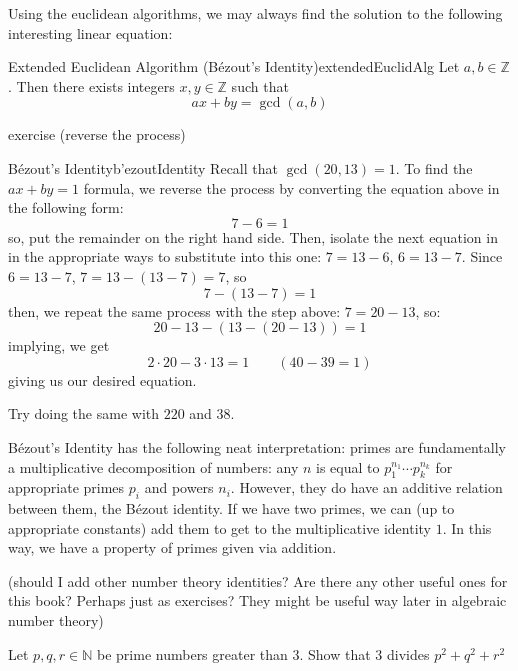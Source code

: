 \documentclass{book}
\newcommand{\N}{{\mathbb{N}}}
\newcommand{\Z}{{\mathbb{Z}}}
\begin{document}
Using the euclidean algorithms, we may always find the solution to the following interesting linear equation:

\begin{thm}{Extended Euclidean Algorithm (B\'ezout's Identity)}{extendedEuclidAlg}
	Let $a,b \in \Z$. Then there exists integers $x,y \in \Z$ such that
\[
	ax +by = \gcd(a,b)
\]
\end{thm}

\begin{Proof}
	exercise (reverse the process)
\end{Proof}

\begin{example}{B\'ezout's Identity}{b'ezoutIdentity}
	Recall that $\gcd(20, 13) = 1$. To find the $ax + by = 1$ formula, we reverse the
	process by converting the equation above in the following form:
	\[
		7 - 6 = 1
	\]
	so, put the remainder on the right hand side. Then, isolate the next equation in in the appropriate ways to
	substitute into this one: $7 = 13-6$, $6 = 13-7$. Since $6 =13-7$, $7 = 13-(13-7) = 7$, so
	\[
		7 - (13-7) = 1
	\]
	then, we repeat the same process with the step above: $7 = 20-13$, so:
	\[
		20-13-(13-(20-13)) = 1
	\]
	implying, we get
	\[
		2\cdot 20 - 3\cdot 13 =1  \qquad (40-39 =1)
	\]
	giving us our desired equation.

	Try doing the same with $220$ and $38$.
\end{example}


B\'ezout’s Identity has the following neat interpretation: primes are fundamentally a multiplicative decomposition of
numbers: any $n$ is equal to $p_1^{n_1}\cdots p_{k}^{n_k}$ for appropriate primes $p_i$ and powers $n_i$. However, they
do have an additive relation between them, the B\'ezout identity. If we have two primes, we can (up to appropriate
constants) add them to get to the multiplicative identity $1$. In this way, we have a property of primes given via
addition.

(should I add other number theory identities? Are there any other useful ones for this book? Perhaps just as exercises?
They might be useful way later in algebraic number theory)

\begin{Exercise}[label=ex:gcdAndLcm]
  \Question Let $p,q,r \in \N$ be prime numbers greater than $3$. Show that $3$ divides $p^2+q^2+r^2$
\end{Exercise}
\begin{Answer}[ref={ex:gcdAndLcm}]
  \Question
\end{Answer}
\end{document}
